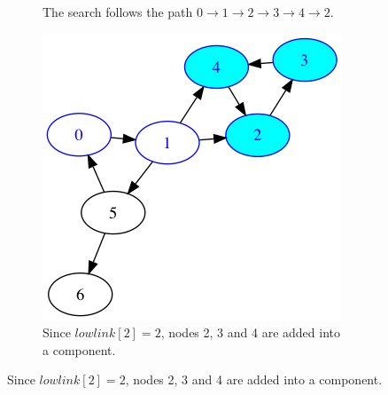 \begin{figure}
\begin{subfigure}{0.3\textwidth}
\caption{The search follows the path $0 \rightarrow 1 \rightarrow 2 \rightarrow 3 
\rightarrow 4 \rightarrow 2$.} \label{fig:tarjan1}
\end{subfigure}
\hspace*{\fill} %
\begin{subfigure}{0.3\textwidth}
\includegraphics[width=\linewidth]{images/tarjan/2.png}
\caption{Since $lowlink[2] = 2$, nodes 2, 3 and 4 are added into a component.} \label{fig:tarjan2}
\end{subfigure}

\vspace{1cm}


\end{figure}

